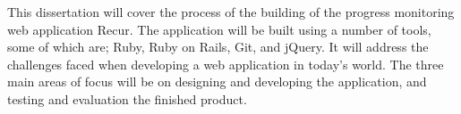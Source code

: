 This dissertation will cover the process of the building of the progress monitoring web application Recur. The application will be built using a number of tools, some of which are; Ruby, Ruby on Rails, Git, and jQuery. It will address the challenges faced when developing a web application in today's world. The three main areas of focus will be on designing and developing the application, and testing and evaluation the finished product.\\
